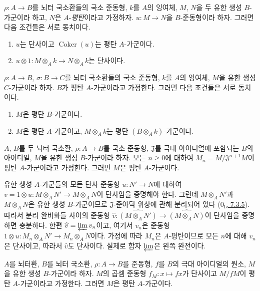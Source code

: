 \begin{env}[10.2.4]
\label{0.10.2.4-fr}
$\rho:A\to B$를 뇌터 국소환들의 국소 준동형, $k$를 $A$의 잉여체,
$M$, $N$을 두 유한 생성 $B$-가군이라 하고, $N$은 $A$-\emph{평탄}이라고
가정하자. $u:M\to N$을 $B$-준동형이라 하자. 그러면 다음 조건들은 서로
동치이다.
\begin{enumerate}
  \item[$a)$] $u$는 단사이고 $\operatorname{Coker}(u)$는 평탄
    $A$-가군이다.
  \item[$b)$] $u\otimes1:M\otimes_A k\to N\otimes_A k$는 단사이다.
\end{enumerate}
\end{env}

\begin{env}[10.2.5]
\label{0.10.2.5-fr}
$\rho:A\to B$, $\sigma:B\to C$를 뇌터 국소환들의 국소 준동형,
$k$를 $A$의 잉여체, $M$을 유한 생성 $C$-가군이라 하자. $B$가 평탄
$A$-가군이라고 가정한다. 그러면 다음 조건들은 서로 동치이다.
\begin{enumerate}
  \item[$a)$] $M$은 평탄 $B$-가군이다.
  \item[$b)$] $M$은 평탄 $A$-가군이고, $M\otimes_A k$는 평탄
    $(B\otimes_A k)$-가군이다.
\end{enumerate}
\end{env}

\begin{proposition}[10.2.6]
\label{0.10.2.6-fr}
$A$, $B$를 두 뇌터 국소환, $\rho:A\to B$를 국소 준동형,
$\mathfrak{J}$를 극대 아이디얼에 포함되는 $B$의 아이디얼, $M$을
유한 생성 $B$-가군이라 하자. 모든 $n\geq0$에 대하여
$M_n=M/\mathfrak{J}^{n+1}M$이 평탄 $A$-가군이라고 가정한다. 그러면
$M$은 평탄 $A$-가군이다.
\end{proposition}

유한 생성 $A$-가군들의 모든 단사 준동형 $u:N'\to N$에 대하여
$v=1\otimes u:M\otimes_A N'\to M\otimes_A N$이 단사임을 증명해야 한다.
그런데 $M\otimes_A N'$과 $M\otimes_A N$은 유한 생성 $B$-가군이므로
$\mathfrak{J}$-준아딕 위상에 관해 분리되어 있다
(\hyperref[0.7.3.5-ko]{$0_{\mathrm I}$, 7.3.5}). 따라서 분리 완비화들
사이의 준동형
$\widehat v:\widehat{(M\otimes_A N')}\to\widehat{(M\otimes_A N)}$이
단사임을 증명하면 충분하다. 한편 $\widehat v=\varprojlim v_n$이고,
여기서 $v_n$은 준동형
$1\otimes u:M_n\otimes_A N'\to M_n\otimes_A N$이다. 가정에 따라
$M_n$은 $A$-평탄이므로 모든 $n$에 대해 $v_n$은 단사이고, 따라서
$\widehat v$도 단사이다. 실제로 함자 $\varprojlim$은 왼쪽 완전이다.

\begin{corollary}[10.2.7]
\label{0.10.2.7-fr}
$A$를 뇌터환, $B$를 뇌터 국소환, $\rho:A\to B$를 준동형,
$f$를 $B$의 극대 아이디얼의 원소, $M$을 유한 생성 $B$-가군이라 하자.
$M$의 곱셈 준동형 $f_M:x\mapsto fx$가 단사이고 $M/fM$이 평탄
$A$-가군이라고 가정한다. 그러면 $M$은 평탄 $A$-가군이다.
\end{corollary}

